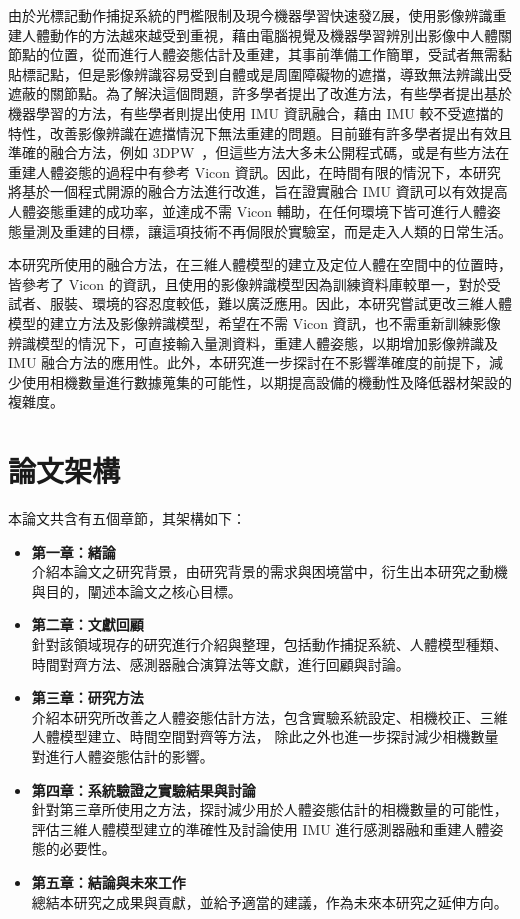 由於光標記動作捕捉系統的門檻限制及現今機器學習快速發Z展，使用影像辨識重建人體動作的方法越來越受到重視，藉由電腦視覺及機器學習辨別出影像中人體關節點的位置，從而進行人體姿態估計及重建，其事前準備工作簡單，受試者無需黏貼標記點，但是影像辨識容易受到自體或是周圍障礙物的遮擋，導致無法辨識出受遮蔽的關節點。為了解決這個問題，許多學者提出了改進方法，有些學者提出基於機器學習的方法，有些學者則提出使用 IMU 資訊融合，藉由 IMU 較不受遮擋的特性，改善影像辨識在遮擋情況下無法重建的問題。目前雖有許多學者提出有效且準確的融合方法，例如 3DPW~\cite{vonMarcard2018}，但這些方法大多未公開程式碼，或是有些方法在重建人體姿態的過程中有參考 Vicon 資訊。因此，在時間有限的情況下，本研究將基於一個程式開源的融合方法進行改進，旨在證實融合 IMU 資訊可以有效提高人體姿態重建的成功率，並達成不需 Vicon 輔助，在任何環境下皆可進行人體姿態量測及重建的目標，讓這項技術不再侷限於實驗室，而是走入人類的日常生活。

本研究所使用的融合方法，在三維人體模型的建立及定位人體在空間中的位置時，皆參考了 Vicon 的資訊，且使用的影像辨識模型因為訓練資料庫較單一，對於受試者、服裝、環境的容忍度較低，難以廣泛應用。因此，本研究嘗試更改三維人體模型的建立方法及影像辨識模型，希望在不需 Vicon 資訊，也不需重新訓練影像辨識模型的情況下，可直接輸入量測資料，重建人體姿態，以期增加影像辨識及 IMU 融合方法的應用性。此外，本研究進一步探討在不影響準確度的前提下，減少使用相機數量進行數據蒐集的可能性，以期提高設備的機動性及降低器材架設的複雜度。


\section{論文架構}
本論文共含有五個章節，其架構如下：

\begin{itemize}
    \item \textbf{第一章：緒論}
    \\ 介紹本論文之研究背景，由研究背景的需求與困境當中，衍生出本研究之動機與目的，闡述本論文之核心目標。
    \item \textbf{第二章：文獻回顧}
    \\ 針對該領域現存的研究進行介紹與整理，包括動作捕捉系統、人體模型種類、時間對齊方法、感測器融合演算法等文獻，進行回顧與討論。
    \item \textbf{第三章：研究方法}
    \\ 介紹本研究所改善之人體姿態估計方法，包含實驗系統設定、相機校正、三維人體模型建立、時間空間對齊等方法，
    除此之外也進一步探討減少相機數量對進行人體姿態估計的影響。
    \item \textbf{第四章：系統驗證之實驗結果與討論}
    \\ 針對第三章所使用之方法，探討減少用於人體姿態估計的相機數量的可能性，評估三維人體模型建立的準確性及討論使用 IMU 進行感測器融和重建人體姿態的必要性。
    \item \textbf{第五章：結論與未來工作}
    \\ 總結本研究之成果與貢獻，並給予適當的建議，作為未來本研究之延伸方向。
\end{itemize}

\clearpage